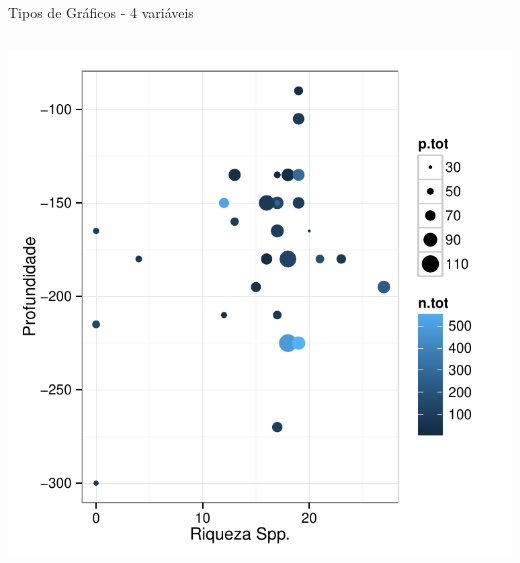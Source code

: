 \documentclass{beamer}\usepackage[]{graphicx}\usepackage[]{color}
\newenvironment{knitrout}{}{} %
\renewenvironment{knitrout}{\setlength{\topsep}{0mm}}{}
\begin{document}
\begin{frame}[fragile]{Tipos de Gráficos - 4 variáveis}
\begin{columns}[t]
\begin{knitrout}
\color{fgcolor}
\includegraphics[width=1\linewidth]{figure/unnamed-chunk-83-1} 

\end{knitrout}

\end{columns}

\end{frame}
\end{document}
